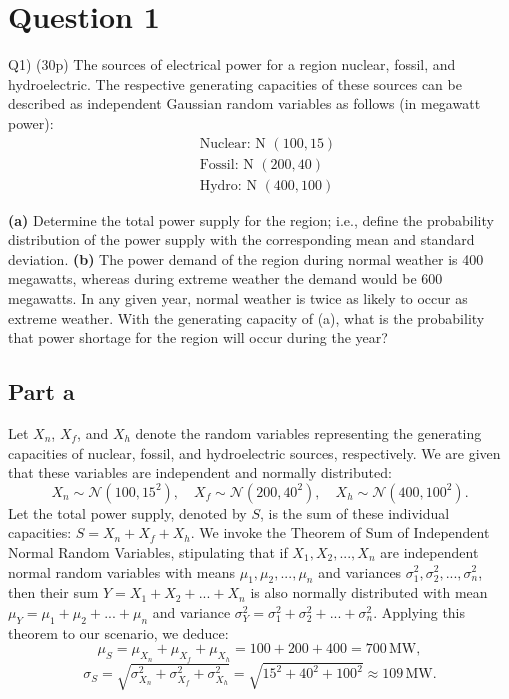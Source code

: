 \documentclass[12pt]{article}
\author{Muhammet Yağcıoğlu - 290204042}
\begin{document}
\maketitle\thispagestyle{fancy}
\pagestyle{fancy}
\tableofcontents
\newpage
\section*{Question 1}
\begin{q}
Q1) (30p) The sources of electrical power for a region nuclear, fossil, and hydroelectric. The respective generating capacities of these sources can be described as independent Gaussian random variables as follows (in megawatt power):
\[
\begin{aligned}
& \text { Nuclear: N }(100,15) \\
& \text { Fossil: N }(200,40) \\
& \text { Hydro: N }(400,100)
\end{aligned}
\]

\textbf{(a)} Determine the total power supply for the region; i.e., define the probability distribution of the power supply with the corresponding mean and standard deviation.
\textbf{(b)} The power demand of the region during normal weather is 400 megawatts, whereas during extreme weather the demand would be 600 megawatts. In any given year, normal weather is twice as likely to occur as extreme weather. With the generating capacity of (a), what is the probability that power shortage for the region will occur during the year?
\end{q}

\subsection*{Part a}

Let \(X_n\), \(X_f\), and \(X_h\) denote the random variables representing the generating capacities of nuclear, fossil, and hydroelectric sources, respectively. We are given that these variables are independent and normally distributed: \[X_n \sim \mathcal{N}(100, 15^2), \quad X_f \sim \mathcal{N}(200, 40^2), \quad X_h \sim \mathcal{N}(400, 100^2).\] Let the total power supply, denoted by \(S\), is the sum of these individual capacities: \(S = X_n + X_f + X_h\). We invoke the Theorem of Sum of Independent Normal Random Variables, stipulating that if \(X_1, X_2, ..., X_n\) are independent normal random variables with means \(\mu_1, \mu_2, ..., \mu_n\) and variances \(\sigma_1^2, \sigma_2^2, ..., \sigma_n^2\), then their sum \(Y = X_1 + X_2 + ... + X_n\) is also normally distributed with mean \(\mu_Y = \mu_1 + \mu_2 + ... + \mu_n\) and variance \(\sigma_Y^2 = \sigma_1^2 + \sigma_2^2 + ... + \sigma_n^2\). Applying this theorem to our scenario, we deduce: \[\mu_S = \mu_{X_n} + \mu_{X_f} + \mu_{X_h} = 100 + 200 + 400 = 700 \, \text{MW},\] \[\sigma_S = \sqrt{\sigma_{X_n}^2 + \sigma_{X_f}^2 + \sigma_{X_h}^2} = \sqrt{15^2 + 40^2 + 100^2} \approx 109 \, \text{MW}.\]
\AnswerTag
\end{document}
